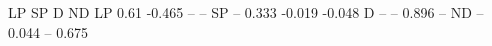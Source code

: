 \begin{Schunk}
\begin{Soutput}
     LP     SP      D     ND
LP 0.61 -0.465     --     --
SP   --  0.333 -0.019 -0.048
D    --     --  0.896     --
ND   --  0.044     --  0.675
\end{Soutput}
\end{Schunk}
